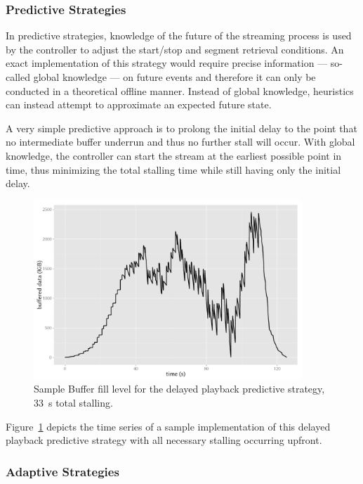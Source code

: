 \subsubsection{Predictive Strategies}

In predictive strategies, knowledge of the future of the streaming process is used by the controller to adjust the start/stop and segment retrieval conditions. An exact implementation of this strategy would require precise information --- so-called global knowledge --- on future events and therefore it can only be conducted in a theoretical offline manner. Instead of global knowledge, heuristics can instead attempt to approximate an expected future state.

A very simple predictive approach is to prolong the initial delay to the point that no intermediate buffer underrun and thus no further stall will occur. With global knowledge, the controller can start the stream at the earliest possible point in time, thus minimizing the total stalling time while still having only the initial delay.

\begin{figure}[htb]
	\centering
	\includegraphics[width=0.9\textwidth]{images/R-bufferlevel-startdelay.pdf}
	\caption{Sample Buffer fill level for the delayed playback predictive strategy, \SI{33}{\second} total stalling.}
\label{c3:fig:bufferlevel-startdelay}
\end{figure}

Figure~\ref{c3:fig:bufferlevel-startdelay} depicts the time series of a sample implementation of this delayed playback predictive strategy with all necessary stalling occurring upfront.


\subsubsection{Adaptive Strategies}

